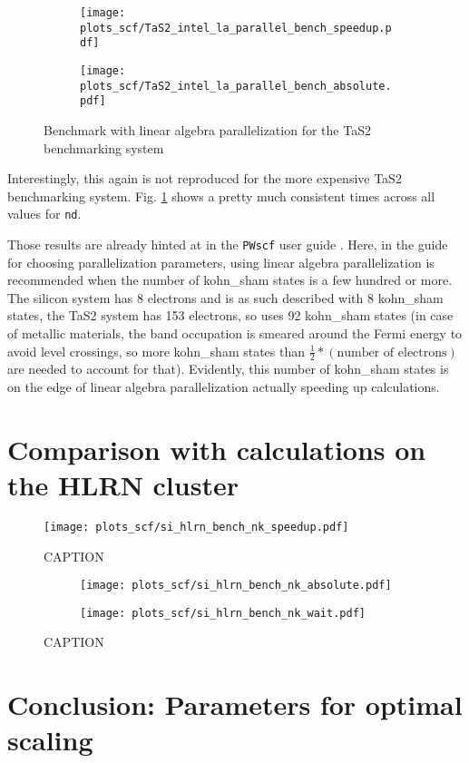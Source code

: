 \documentclass[main.tex]{subfiles}
\begin{document}
\begin{figure}[ht!]
\begin{subfigure}[b]{0.49\textwidth}
    \centering
    \texttt{[image: plots\_scf/TaS2\_intel\_la\_parallel\_bench\_speedup.pdf]}
\end{subfigure}
\begin{subfigure}[b]{0.49\textwidth}
    \centering
    \texttt{[image: plots\_scf/TaS2\_intel\_la\_parallel\_bench\_absolute.pdf]}
\end{subfigure}
\label{fig:scaling_scf_nd_tas2}
\caption{Benchmark with linear algebra parallelization for the TaS2 benchmarking system}
\end{figure}

Interestingly, this again is not reproduced for the more expensive TaS2 benchmarking system.
Fig. \ref{fig:scaling_scf_nd_tas2} shows a pretty much consistent times across all values for \texttt{nd}.

Those results are already hinted at in the \texttt{PWscf} user guide \cite{noauthor_pwscf_nodate}.
Here, in the guide for choosing parallelization parameters, using linear algebra parallelization is recommended when the number of \acrshort{kohn_sham} states is a few hundred or more.
The silicon system has 8 electrons and is as such described with 8 \gls{kohn_sham} states, the TaS2 system has 153 electrons, so \QE uses 92 \gls{kohn_sham} states (in case of metallic materials, the band occupation is smeared around the Fermi energy to avoid level crossings, so more \gls{kohn_sham} states than \(\frac{1}{2} * (\textrm{number of electrons})\) are needed to account for that).
Evidently, this number of \acrshort{kohn_sham} states is on the edge of linear algebra parallelization actually speeding up calculations.

\section{Comparison with calculations on the HLRN cluster}

\begin{figure}[ht!]
\centering
\texttt{[image: plots\_scf/si\_hlrn\_bench\_nk\_speedup.pdf]}
\caption{CAPTION}
\label{fig:scaling_scf_hlrn_nk_si_speedup}
\end{figure}

\begin{figure}[ht!]
\begin{subfigure}[b]{0.49\textwidth}
    \centering
    \texttt{[image: plots\_scf/si\_hlrn\_bench\_nk\_absolute.pdf]}
\end{subfigure}
\begin{subfigure}[b]{0.49\textwidth}
    \centering
    \texttt{[image: plots\_scf/si\_hlrn\_bench\_nk\_wait.pdf]}
\end{subfigure}
\caption{CAPTION}
\label{fig:scaling_scf_hlrn_nprocs_nk_absolute_wait}
\end{figure}

\section{Conclusion: Parameters for optimal scaling}
\end{document}
